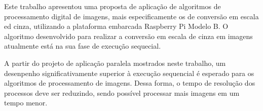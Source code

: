 Este trabalho apresentou uma proposta de aplicação de algoritmos de
processamento digital de imagens, mais especificamente os de conversão em escala
ed cinza, utilizando a plataforma embarcada Raspberry Pi Modelo B. O algoritmo
desenvolvido para realizar a conversão em escala de cinza em imagens atualmente
está na sua fase de execução sequecial.

A partir do projeto de aplicação paralela mostrados neste trabalho, um
desenpenho significativamente superior à execução sequencial é esperado para os
algoritmos de processamento de imagens. Dessa forma, o tempo de resolução dos
processos deve ser reduzindo, sendo possível processar mais imagens em um tempo
menor.  
